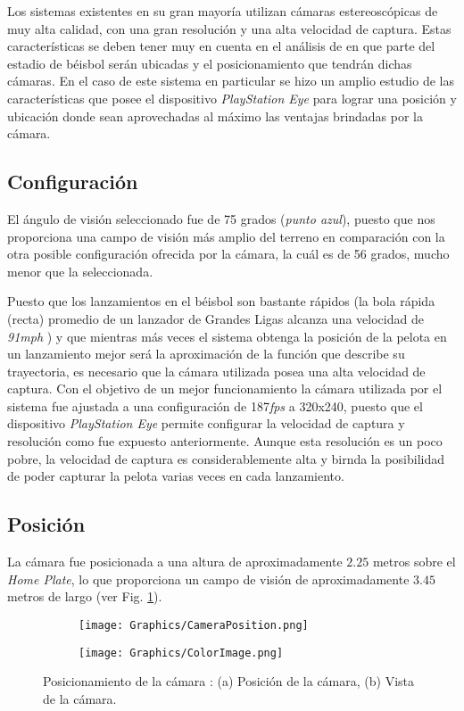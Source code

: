 Los sistemas existentes en su gran mayoría utilizan cámaras estereoscópicas de muy alta calidad, con una gran resolución y una alta velocidad de captura. Estas características se deben tener muy en cuenta en el análisis de en que parte del estadio de béisbol serán ubicadas y el posicionamiento que tendrán dichas cámaras. En el caso de este sistema en particular se hizo un amplio estudio de las características que posee el dispositivo \textit{PlayStation Eye} para lograr una posición y ubicación donde sean aprovechadas al máximo las ventajas brindadas por la cámara.

\subsection{Configuración}

El ángulo de visión seleccionado fue de 75 grados (\textit{punto azul}), puesto que nos proporciona una campo de visión más amplio del terreno en comparación con la otra posible configuración ofrecida por la cámara, la cuál es de 56 grados, mucho menor que la seleccionada.

Puesto que los lanzamientos en el béisbol son bastante rápidos (la bola rápida (recta) promedio de un lanzador de Grandes Ligas alcanza una velocidad de \textit{91mph} \cite{PitcherSpeed}) y que mientras más veces el sistema obtenga la posición de la pelota en un lanzamiento mejor será la aproximación de la función que describe su trayectoria, es necesario que la cámara utilizada posea una alta velocidad de captura. Con el objetivo de un mejor funcionamiento la cámara utilizada por el sistema fue ajustada a una configuración de 187\textit{fps} a 320x240, puesto que el dispositivo \textit{PlayStation Eye} permite configurar la velocidad de captura y resolución como fue expuesto anteriormente. Aunque esta resolución es un poco pobre, la velocidad de captura es considerablemente alta y birnda la posibilidad de poder capturar la pelota varias veces en cada lanzamiento.

\subsection{Posición}\label{sec:Position}

La cámara fue posicionada a una altura de aproximadamente $2.25$ metros sobre el \textit{Home Plate}, lo que proporciona un campo de visión de aproximadamente $3.45$ metros de largo (ver Fig. \ref{fig:CameraPosition}).

\begin{figure}[!h]
	\centering
	\begin{subfigure}[b]{0.4\linewidth}
		\texttt{[image: Graphics/CameraPosition.png]}
		\caption{}
	\end{subfigure}
	\begin{subfigure}[b]{0.4\linewidth}
		\texttt{[image: Graphics/ColorImage.png]}
		\caption{}
	\end{subfigure}
    \caption{Posicionamiento de la cámara : (a) Posición de la cámara, (b) Vista de la cámara.}
    \label{fig:CameraPosition}
\end{figure}

